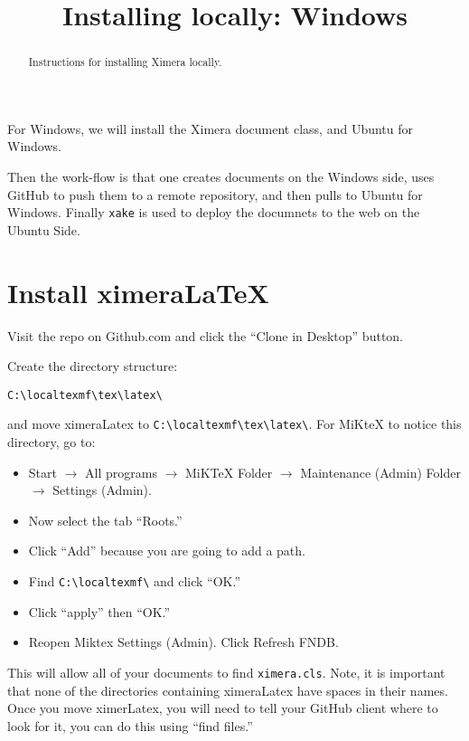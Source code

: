 \documentclass{ximera}
\title{Installing locally: Windows}
\begin{document}
\begin{abstract}
Instructions for installing Ximera locally.
\end{abstract}
\maketitle

For Windows, we will install the Ximera document class, and Ubuntu for Windows.

Then the work-flow is that one creates documents on the Windows side,
uses GitHub to push them to a remote repository, and then pulls to
Ubuntu for Windows. Finally \verb|xake| is used to deploy the
documnets to the web on the Ubuntu Side.


\section{Install ximeraLaTeX}


Visit the repo on Github.com  and click the
``Clone in Desktop'' button.



Create the directory structure:

\begin{verbatim}
C:\localtexmf\tex\latex\
\end{verbatim}

and move ximeraLatex to \verb|C:\localtexmf\tex\latex\|. For MiKteX to notice this
directory, go to:

\begin{itemize}
\item Start $\to$ All programs $\to$ MiKTeX Folder $\to$ Maintenance (Admin) Folder $\to$ Settings (Admin).
\item Now select the tab ``Roots.''
\item Click ``Add'' because you are going to add a path.
\item Find \verb|C:\localtexmf\| and click ``OK.''
\item Click ``apply'' then ``OK.''
\item Reopen Miktex Settings (Admin). Click Refresh FNDB.
\end{itemize}
This will allow all of your documents to find \verb|ximera.cls|. Note, it is
important that none of the directories containing ximeraLatex have
spaces in their names. Once you move ximerLatex, you will need to tell
your GitHub client where to look for it, you can do this using ``find
files.''
\end{document}
